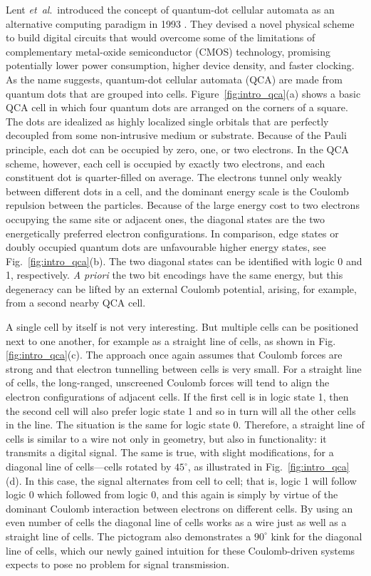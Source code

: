 Lent \emph{et~al}.\ introduced the concept of quantum-dot cellular automata as
an alternative computing paradigm in 1993 \cite{lent1993quantum}. They devised a
novel physical scheme to build digital circuits that would overcome some of the
limitations of complementary metal-oxide semiconductor (CMOS) technology,
promising potentially lower power consumption, higher device density, and faster
clocking. As the name suggests, quantum-dot cellular automata (QCA) are made
from quantum dots that are grouped into cells. Figure~\ref{fig:intro_qca}(a)
shows a basic QCA cell in which four quantum dots are arranged on the corners of
a square. The dots are idealized as highly localized single orbitals that are
perfectly decoupled from some non-intrusive medium or substrate.  Because of the
Pauli principle, each dot can be occupied by zero, one, or two electrons. In the
QCA scheme, however, each cell is occupied by exactly two electrons, and each
constituent dot is quarter-filled on average. The electrons tunnel only weakly
between different dots in a cell, and the dominant energy scale is the Coulomb
repulsion between the particles. Because of the large energy cost to two
electrons occupying the same site or adjacent ones, the diagonal states are the
two energetically preferred electron configurations. In comparison, edge states
or doubly occupied quantum dots are unfavourable higher energy states, see
Fig.~\ref{fig:intro_qca}(b). The two diagonal states can be identified with
logic 0 and 1, respectively. \emph{A priori} the two bit encodings have the same
energy, but this degeneracy can be lifted by an external Coulomb potential,
arising, for example, from a second nearby QCA cell.

A single cell by itself is not very interesting. But multiple cells can be
positioned next to one another, for example as a straight line of cells, as
shown in Fig.\ref{fig:intro_qca}(c). The approach once again assumes that
Coulomb forces are strong and that electron tunnelling between cells is very
small. For a straight line of cells, the long-ranged, unscreened Coulomb forces
will tend to align the electron configurations of adjacent cells. If the first
cell is in logic state 1, then the second cell will also prefer logic state 1
and so in turn will all the other cells in the line. The situation is the same
for logic state 0. Therefore, a straight line of cells is similar to a wire not
only in geometry, but also in functionality: it transmits a digital signal. The
same is true, with slight modifications, for a diagonal line of cells---cells
rotated by $45^{\circ}$, as illustrated in Fig.~\ref{fig:intro_qca}(d). In this
case, the signal alternates from cell to cell; that is, logic 1 will follow
logic 0 which followed from logic 0, and this again is simply by virtue of the
dominant Coulomb interaction between electrons on different cells. By using an
even number of cells the diagonal line of cells works as a wire just as well as
a straight line of cells. The pictogram also demonstrates a $90^{\circ}$ kink
for the diagonal line of cells, which our newly gained intuition for these
Coulomb-driven systems expects to pose no problem for signal transmission.

